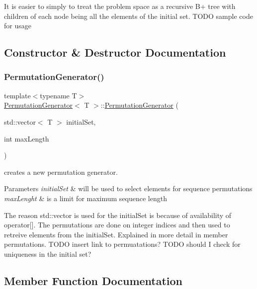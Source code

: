 It is easier to simply to treat the problem space as a recursive B+ tree with children of each node being all the elements of the initial set. T\+O\+DO sample code for usage 

\subsection{Constructor \& Destructor Documentation}
\mbox{\label{classPermutationGenerator_a8bd348f28ef2830e335056f877246244}} 
\subsubsection{\texorpdfstring{Permutation\+Generator()}{PermutationGenerator()}}
{\footnotesize\ttfamily template$<$typename T$>$ \\
\hyperlink{classPermutationGenerator}{Permutation\+Generator}$<$ T $>$\+::\hyperlink{classPermutationGenerator}{Permutation\+Generator} (\begin{DoxyParamCaption}\item[{std\+::vector$<$ T $>$}]{initial\+Set,  }\item[{int}]{max\+Length }\end{DoxyParamCaption})}

creates a new permutation generator. 
\begin{DoxyParams}{Parameters}
{\em initial\+Set} & will be used to select elements for sequence permutations \\
\hline
{\em max\+Lenght} & is a limit for maximum sequence length\\
\hline
\end{DoxyParams}
The reason std\+::vector is used for the initial\+Set is because of availability of operator\mbox{[}\mbox{]}. The permutations are done on integer indices and then used to retreive elements from the initial\+Set. Explained in more detail in member permutations. T\+O\+DO insert link to permuatations? T\+O\+DO should I check for uniqueness in the initial set? 

\subsection{Member Function Documentation}
\mbox{\label{classPermutationGenerator_a7d5c9dcbe711a74de2ac73ef128a52c9}} 

